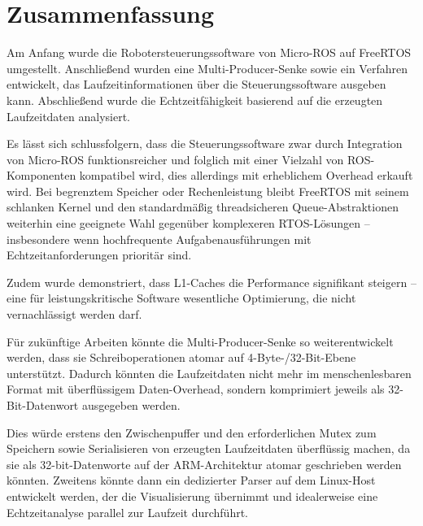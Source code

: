 \section{Zusammenfassung}

Am Anfang wurde die Robotersteuerungssoftware von Micro-ROS auf FreeRTOS
umgestellt. Anschließend wurden eine Multi-Producer-Senke sowie ein Verfahren
entwickelt, das Laufzeitinformationen über die Steuerungssoftware ausgeben kann.
Abschließend wurde die Echtzeitfähigkeit basierend auf die erzeugten
Laufzeitdaten analysiert.

Es lässt sich schlussfolgern, dass die Steuerungssoftware zwar durch Integration
von Micro-ROS funktionsreicher und folglich mit einer Vielzahl von
ROS-Komponenten kompatibel wird, dies allerdings mit erheblichem Overhead
erkauft wird. Bei begrenztem Speicher oder Rechenleistung bleibt FreeRTOS mit
seinem schlanken Kernel und den standardmäßig threadsicheren Queue-Abstraktionen
weiterhin eine geeignete Wahl gegenüber komplexeren RTOS-Lösungen --
insbesondere wenn hochfrequente Aufgabenausführungen mit Echtzeitanforderungen
prioritär sind.

Zudem wurde demonstriert, dass L1-Caches die Performance signifikant steigern --
eine für leistungskritische Software wesentliche Optimierung, die nicht
vernachlässigt werden darf.

Für zukünftige Arbeiten könnte die Multi-Producer-Senke so weiterentwickelt
werden, dass sie Schreiboperationen atomar auf 4-Byte-/32-Bit-Ebene unterstützt.
Dadurch könnten die Laufzeitdaten nicht mehr im menschenlesbaren Format mit
überflüssigem Daten-Overhead, sondern komprimiert jeweils als 32-Bit-Datenwort
ausgegeben werden.

Dies würde erstens den Zwischenpuffer und den erforderlichen Mutex zum Speichern
sowie Serialisieren von erzeugten Laufzeitdaten überflüssig machen, da sie als
32-bit-Datenworte auf der ARM-Architektur atomar geschrieben werden könnten.
Zweitens könnte dann ein dedizierter Parser auf dem Linux-Host entwickelt
werden, der die Visualisierung übernimmt und idealerweise eine Echtzeitanalyse
parallel zur Laufzeit durchführt.

